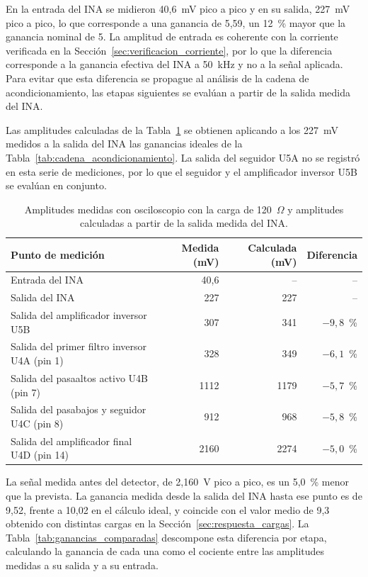 \documentclass[12pt,a4paper]{article}
\begin{document}
En la entrada del INA se midieron 40,6~mV pico a pico y en su salida, 227~mV pico a pico, lo
que corresponde a una ganancia de 5,59, un 12~\% mayor que la ganancia nominal de 5. La
amplitud de entrada es coherente con la corriente verificada en la
Sección~\ref{sec:verificacion_corriente}, por lo que la diferencia corresponde a la ganancia
efectiva del INA a 50~kHz y no a la señal aplicada. Para evitar que esta diferencia se propague
al análisis de la cadena de acondicionamiento, las etapas siguientes se evalúan a partir de la
salida medida del INA.

Las amplitudes calculadas de la Tabla~\ref{tab:amplitudes_medidas} se obtienen aplicando a los
227~mV medidos a la salida del INA las ganancias ideales de la
Tabla~\ref{tab:cadena_acondicionamiento}. La salida del seguidor U5A no se registró en esta
serie de mediciones, por lo que el seguidor y el amplificador inversor U5B se evalúan en
conjunto.

\begin{table}[htbp]
    \centering
    \caption{Amplitudes medidas con osciloscopio con la carga de 120~$\Omega$ y amplitudes
    calculadas a partir de la salida medida del INA.}
    \label{tab:amplitudes_medidas}
    \begin{tabular}{lrrr}
        \hline
        Punto de medición & Medida (mV) & Calculada (mV) & Diferencia \\
        \hline
        Entrada del INA & 40,6 & -- & -- \\
        Salida del INA & 227 & 227 & -- \\
        Salida del amplificador inversor U5B & 307 & 341 & $-9{,}8$~\% \\
        Salida del primer filtro inversor U4A (pin 1) & 328 & 349 & $-6{,}1$~\% \\
        Salida del pasaaltos activo U4B (pin 7) & 1112 & 1179 & $-5{,}7$~\% \\
        Salida del pasabajos y seguidor U4C (pin 8) & 912 & 968 & $-5{,}8$~\% \\
        Salida del amplificador final U4D (pin 14) & 2160 & 2274 & $-5{,}0$~\% \\
        \hline
    \end{tabular}
\end{table}

La señal medida antes del detector, de 2,160~V pico a pico, es un 5,0~\% menor que la prevista.
La ganancia medida desde la salida del INA hasta ese punto es de 9,52, frente a 10,02 en el
cálculo ideal, y coincide con el valor medio de 9,3 obtenido con distintas cargas en la
Sección~\ref{sec:respuesta_cargas}. La Tabla~\ref{tab:ganancias_comparadas} descompone esta
diferencia por etapa, calculando la ganancia de cada una como el cociente entre las amplitudes
medidas a su salida y a su entrada.
\end{document}
